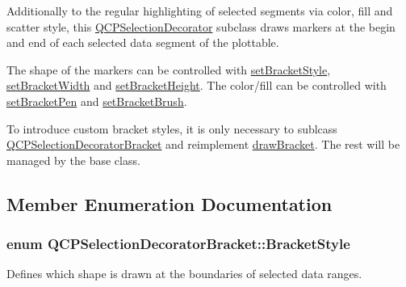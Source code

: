 Additionally to the regular highlighting of selected segments via color, fill and scatter style, this \hyperlink{class_q_c_p_selection_decorator}{Q\+C\+P\+Selection\+Decorator} subclass draws markers at the begin and end of each selected data segment of the plottable.

The shape of the markers can be controlled with \hyperlink{class_q_c_p_selection_decorator_bracket_a04507697438f6ad8cc2aeea5422dcbe5}{set\+Bracket\+Style}, \hyperlink{class_q_c_p_selection_decorator_bracket_a291b59cab98ce93a0a3c85963fe10f5e}{set\+Bracket\+Width} and \hyperlink{class_q_c_p_selection_decorator_bracket_aed773ad737201cca40efc6fe451acad8}{set\+Bracket\+Height}. The color/fill can be controlled with \hyperlink{class_q_c_p_selection_decorator_bracket_ac0e392a6097990f8aa978932a8fa05d6}{set\+Bracket\+Pen} and \hyperlink{class_q_c_p_selection_decorator_bracket_a2f4ea0bfb0ea980252b76dd349dd53aa}{set\+Bracket\+Brush}.

To introduce custom bracket styles, it is only necessary to sublcass \hyperlink{class_q_c_p_selection_decorator_bracket}{Q\+C\+P\+Selection\+Decorator\+Bracket} and reimplement \hyperlink{class_q_c_p_selection_decorator_bracket_a8153966498e2a8d4c11c681e06d7d692}{draw\+Bracket}. The rest will be managed by the base class. 

\subsection{Member Enumeration Documentation}
\subsubsection[{\texorpdfstring{Bracket\+Style}{BracketStyle}}]{\setlength{\rightskip}{0pt plus 5cm}enum {\bf Q\+C\+P\+Selection\+Decorator\+Bracket\+::\+Bracket\+Style}}\hypertarget{class_q_c_p_selection_decorator_bracket_aa6d18517ec0553575bbef0de4252336e}{}\label{class_q_c_p_selection_decorator_bracket_aa6d18517ec0553575bbef0de4252336e}
Defines which shape is drawn at the boundaries of selected data ranges.

